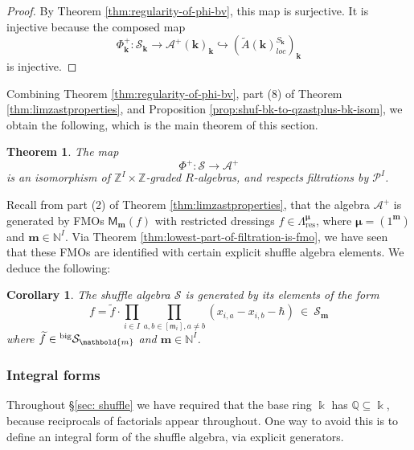 \documentclass[11pt,reqno]{amsart}
\renewcommand{\mathbf}{\mathbold}
\numberwithin{equation}{section}
\newtheorem{Theorem}[equation]{Theorem}
\newtheorem{Corollary}[equation]{Corollary}
\theoremstyle{definition}
\newcommand{\cA}{\mathcal{A}}
\newcommand{\cP}{\mathcal{P}}
\newcommand{\cS}{\mathcal{S}}
\newcommand{\bk}{\mathbf{k}}
\newcommand{\bm}{\mathbf{m}}
\newcommand{\NN}{\mathbb{N}}
\newcommand{\QQ}{\mathbb{Q}}
\newcommand{\ZZ}{\mathbb{Z}}
\renewcommand{\tilde}[1]{\widetilde{#1}}
\newcommand{\leftexp}[2]{\vphantom{#2}^{#1} #2}
\newcommand{\kk}{\Bbbk}
\newcommand{\sm}{\mathsf{m}}
\newcommand{\M}{\mathsf{M}}
\newcommand{\vertexset}{I}
\newcommand{\GT}{\Lambda}
\newcommand{\base}{R}
\newcommand{\Partitions}{\cP}
\newcommand{\bmu}{{\boldsymbol{\mu}}}
\newcommand{\qzastplus}{\cA^{+}}
\newcommand{\res}{\mathrm{res}}
\newcommand{\GKLO}[1]{\tilde{A}(#1)_{loc}}
\newcommand{\shu}{\cS}
\newcommand{\preshu}{\leftexp{\mathrm{big}}{\cS}}
\begin{document}
\begin{proof}
  By Theorem \ref{thm:regularity-of-phi-bv}, this map is surjective. It is injective because the composed map
  \begin{equation}
    \label{eq:46}
  \Phi^+_{\bk} : \cS_{\bk} \rightarrow \qzastplus(\bk)_{\bk} \hookrightarrow \left(\GKLO{\bk}^{S_\bk}\right)_{\bk}
  \end{equation}
  is injective. 
\end{proof}

Combining Theorem \ref{thm:regularity-of-phi-bv}, part (8) of Theorem \ref{thm:limzastproperties}, and Proposition \ref{prop:shuf-bk-to-qzastplus-bk-isom}, we obtain the following, which is the main theorem of this section.

\begin{Theorem}
\label{thm:isoshuaplus}
The map
$$
  \Phi^+ : \cS \rightarrow \qzastplus 
$$
is an isomorphism of $\ZZ^\vertexset\times \ZZ$-graded $\base$-algebras, and respects filtrations by $\Partitions^\vertexset$.
\end{Theorem}

Recall from part (2) of Theorem \ref{thm:limzastproperties}, that the algebra $\qzastplus$ is generated by FMOs $\M_\bm(f)$ with restricted dressings $f\in \GT^\bmu_{\res}$, where $\bmu = (1^\bm)$ and $\bm \in \NN^\vertexset$.  Via Theorem \ref{thm:lowest-part-of-filtration-is-fmo}, we have seen that these FMOs are identified with certain explicit  shuffle algebra elements. We deduce the following:

\begin{Corollary}
    The shuffle algebra $\shu$ is generated by its elements of the form 
    $$
        f = \tilde{f} \cdot \prod_{i \in \vertexset} \prod_{a,b \in [\sm_i], a \neq b} (x_{i,a} - x_{i,b} - \hbar) \ \in \ \shu_\bm
    $$
where $\tilde{f} \in \preshu_{\bm}$ and $\bm \in \NN^\vertexset$.
\end{Corollary}


\subsubsection{Integral forms} 
\label{ssec:integralform}
Throughout \S \ref{sec: shuffle} we have required that the base ring $\kk$ has $\QQ \subseteq\kk$, because reciprocals of factorials appear throughout. One way to avoid this is to define an integral form of the shuffle algebra, via explicit generators.
\end{document}
